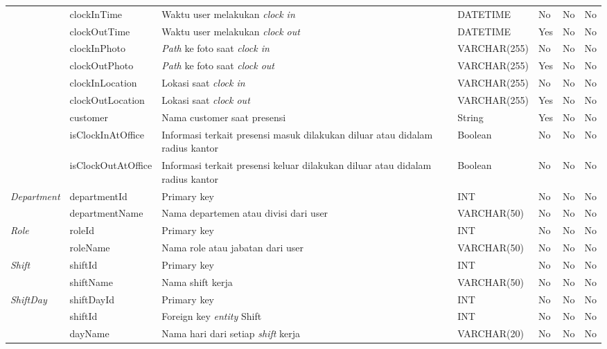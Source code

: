 \begin{longtable}{ |p{3cm}|p{3cm}|p{4cm}|p{3cm}|p{2cm}|p{2cm}|p{2cm}|}
\multirow{8}{*}{}
&clockInTime
&Waktu user melakukan \textit{clock in}
&DATETIME
&No
&No
&No
\\ 
\cline{2-7}
&clockOutTime
&Waktu user melakukan \textit{clock out}
&DATETIME
&Yes
&No
&No
\\ 
\cline{2-7}
&clockInPhoto 
&\textit{Path} ke foto saat \textit{clock in}
&VARCHAR(255)
&No
&No
&No
\\ 
\cline{2-7}
&clockOutPhoto
&\textit{Path} ke foto saat \textit{clock out}
&VARCHAR(255)
&Yes
&No
&No
\\ 
\cline{2-7}
&clockInLocation
&Lokasi saat \textit{clock in}
&VARCHAR(255)
&No
&No
&No
\\ 
\cline{2-7}
&clockOutLocation
&Lokasi saat \textit{clock out}
&VARCHAR(255)
&Yes
&No
&No
\\ 
\cline{2-7}
&customer
&Nama customer saat presensi
&String
&Yes
&No
&No
\\ 
\cline{2-7}
&isClockInAtOffice
&Informasi terkait presensi masuk dilakukan diluar atau didalam radius kantor
&Boolean
&No
&No
&No
\\ 
\hline

\multirow{1}{*}{}
&isClockOutAtOffice
&Informasi terkait presensi keluar dilakukan diluar atau didalam radius kantor
&Boolean
&No
&No
&No
\\ 
\hline

\multirow{2}{*}{\textit{Department}}
&departmentId
&Primary key
&INT
&No
&No
&No
\\
\cline{2-7}
&departmentName
&Nama departemen atau divisi dari user
&VARCHAR(50)
&No
&No
&No
\\ 
\hline

\multirow{2}{*}{\textit{Role}}
&roleId
&Primary key
&INT
&No
&No
&No
\\
\cline{2-7}
&roleName
&Nama role atau jabatan dari user
&VARCHAR(50)
&No
&No
&No
\\ 
\hline

\multirow{2}{*}{\textit{Shift}}
&shiftId
&Primary key
&INT
&No
&No
&No
\\
\cline{2-7}
&shiftName
&Nama shift kerja
&VARCHAR(50)
&No
&No
&No
\\ 
\hline

\multirow{3}{*}{\textit{ShiftDay}}
&shiftDayId
&Primary key
&INT
&No
&No
&No
\\
\cline{2-7}
&shiftId
&Foreign key \textit{entity} Shift
&INT
&No
&No
&No
\\
\cline{2-7}
&dayName
&Nama hari dari setiap \textit{shift} kerja
&VARCHAR(20)
&No
&No
&No
\\
\hline


\end{longtable}
